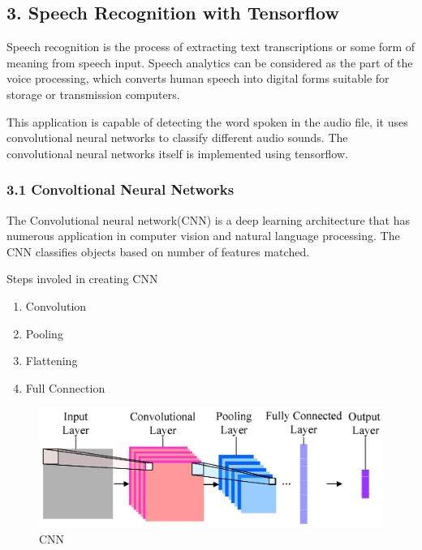\documentclass[11pt]{article}
\makeatletter
\def\maxwidth{\ifdim\Gin@nat@width>\linewidth\linewidth
    \else\Gin@nat@width\fi}
\let\Oldincludegraphics\includegraphics
\renewcommand{\includegraphics}[1]{\Oldincludegraphics[width=.8\maxwidth]{#1}}
\providecommand{\tightlist}{%
      \setlength{\itemsep}{0pt}\setlength{\parskip}{0pt}}
\makeatother
\begin{document}
    \subsection{3. Speech Recognition with
Tensorflow}\label{speech-recognition-with-tensorflow}

Speech recognition is the process of extracting text transcriptions or
some form of meaning from speech input. Speech analytics can be
considered as the part of the voice processing, which converts human
speech into digital forms suitable for storage or transmission
computers.

This application is capable of detecting the word spoken in the audio
file, it uses convolutional neural networks to classify different audio
sounds. The convolutional neural networks itself is implemented using
tensorflow.

    \subsubsection{3.1 Convoltional Neural
Networks}\label{convoltional-neural-networks}

The Convolutional neural network(CNN) is a deep learning architecture
that has numerous application in computer vision and natural language
processing. The CNN classifies objects based on number of features
matched.

Steps involed in creating CNN

\begin{enumerate}
\def\labelenumi{\arabic{enumi}.}
\tightlist
\item
  Convolution
\item
  Pooling
\item
  Flattening
\item
  Full Connection
\end{enumerate}

    \begin{figure}
\centering
\includegraphics{convo.png}
\caption{CNN}
\end{figure}
\end{document}
